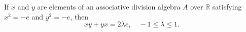 If $x$ and $y$ are elements of an associative division algebra $A$ over $\mathbb{R}$ satisfying $x^2 = -e$ and $y^2 = -e$, then
$$xy + yx = 2\lambda e, \quad -1 \leq \lambda \leq 1.$$

